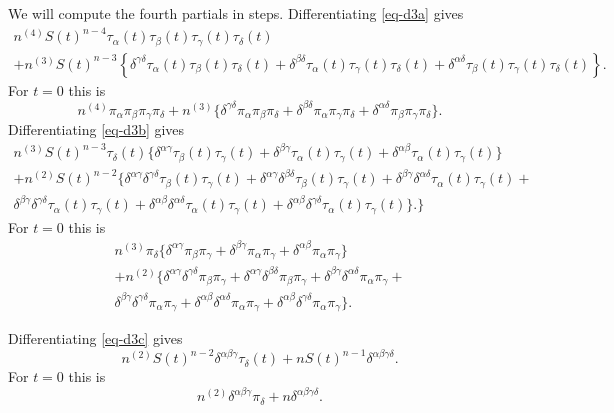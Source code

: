 \documentclass[
  12pt,
  letterpaper,
  DIV=11,
  numbers=noendperiod]{scrartcl}
\begin{document}
We will compute the fourth partials in steps. Differentiating
\eqref{eq-d3a} gives \begin{multline}
n^{(4)}S(t)^{n-4}\tau_\alpha(t)\tau_\beta(t)\tau_\gamma(t)\tau_\delta(t)\\
+n^{(3)}S(t)^{n-3}\left\{\delta^{\gamma\delta}\tau_\alpha(t)\tau_\beta(t)\tau_\delta(t)+\delta^{\beta\delta}\tau_\alpha(t)\tau_\gamma(t)\tau_\delta(t)+\delta^{\alpha\delta}\tau_\beta(t)\tau_\gamma(t)\tau_\delta(t)\right\}.
\end{multline} For \(t=0\) this is \begin{equation}
n^{(4)}\pi_\alpha\pi_\beta\pi_\gamma\pi_\delta+n^{(3)}\{\delta^{\gamma\delta}\pi_\alpha\pi_\beta\pi_\delta+\delta^{\beta\delta}\pi_\alpha\pi_\gamma\pi_\delta+\delta^{\alpha\delta}\pi_\beta\pi_\gamma\pi_\delta\}.\label{eq-d4a}
\end{equation} Differentiating \eqref{eq-d3b} gives \begin{multline}
n^{(3)}S(t)^{n-3}\tau_\delta(t)\{\delta^{\alpha\gamma}\tau_\beta(t)\tau_\gamma(t)+\delta^{\beta\gamma}\tau_\alpha(t)\tau_\gamma(t)+\delta^{\alpha\beta}\tau_\alpha(t)\tau_\gamma(t)\}\\
+n^{(2)}S(t)^{n-2}\{
\delta^{\alpha\gamma}\delta^{\gamma\delta}\tau_\beta(t)\tau_\gamma(t)+
\delta^{\alpha\gamma}\delta^{\beta\delta}\tau_\beta(t)\tau_\gamma(t)+
\delta^{\beta\gamma}\delta^{\alpha\delta}\tau_\alpha(t)\tau_\gamma(t)+\\
\delta^{\beta\gamma}\delta^{\gamma\delta}\tau_\alpha(t)\tau_\gamma(t)+
\delta^{\alpha\beta}\delta^{\alpha\delta}\tau_\alpha(t)\tau_\gamma(t)+
\delta^{\alpha\beta}\delta^{\gamma\delta}\tau_\alpha(t)\tau_\gamma(t)\}.
\}
\end{multline} For \(t=0\) this is \begin{multline}
n^{(3)}\pi_\delta\{\delta^{\alpha\gamma}\pi_\beta\pi_\gamma+\delta^{\beta\gamma}\pi_\alpha\pi_\gamma+\delta^{\alpha\beta}\pi_\alpha\pi_\gamma\}\\
+n^{(2)}\{
\delta^{\alpha\gamma}\delta^{\gamma\delta}\pi_\beta\pi_\gamma+
\delta^{\alpha\gamma}\delta^{\beta\delta}\pi_\beta\pi_\gamma+
\delta^{\beta\gamma}\delta^{\alpha\delta}\pi_\alpha\pi_\gamma+\\
\delta^{\beta\gamma}\delta^{\gamma\delta}\pi_\alpha\pi_\gamma+
\delta^{\alpha\beta}\delta^{\alpha\delta}\pi_\alpha\pi_\gamma+
\delta^{\alpha\beta}\delta^{\gamma\delta}\pi_\alpha\pi_\gamma\}.
\end{multline}

Differentiating \eqref{eq-d3c} gives \begin{equation}
n^{(2)}S(t)^{n-2}\delta^{\alpha\beta\gamma}\tau_\delta(t)+nS(t)^{n-1}\delta^{\alpha\beta\gamma\delta}.\label{eq-d4c}
\end{equation} For \(t=0\) this is \begin{equation}
n^{(2)}\delta^{\alpha\beta\gamma}\pi_\delta+n\delta^{\alpha\beta\gamma\delta}.\label{eq-d5c}
\end{equation}
\end{document}
